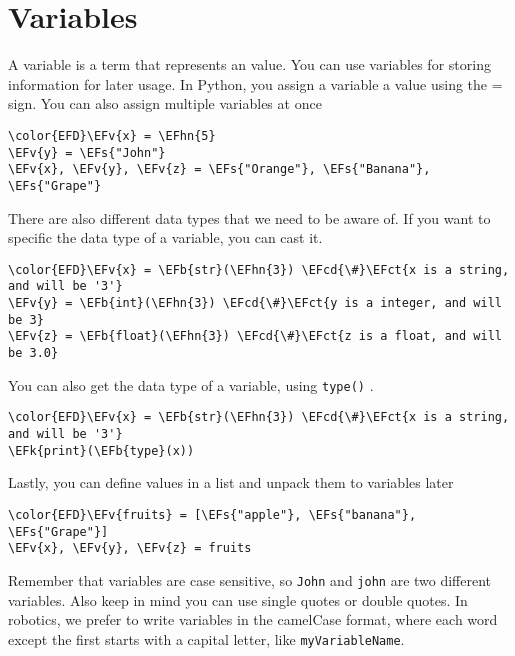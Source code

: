 \documentclass{scrartcl}
\newcommand{\EFk}[1]{\textcolor{EFk}{#1}} %
\newcommand{\EFs}[1]{\textcolor{EFs}{#1}} %
\newcommand{\EFb}[1]{\textcolor{EFb}{#1}} %
\newcommand{\EFct}[1]{\textcolor{EFct}{#1}} %
\newcommand{\EFv}[1]{\textcolor{EFv}{#1}} %
\newcommand{\EFcd}[1]{\textcolor{EFcd}{#1}} %
\newcommand{\EFhn}[1]{\textcolor{EFhn}{\textbf{#1}}} %
\begin{document}
\section{Variables}
\label{sec:org61157c0}
A variable is a term that represents an value. You can use variables for storing
information for later usage. In Python, you assign a variable a value using the
= sign. You can also assign multiple variables at once
\begin{Code}
\begin{Verbatim}[]
\color{EFD}\EFv{x} = \EFhn{5}
\EFv{y} = \EFs{"John"}
\EFv{x}, \EFv{y}, \EFv{z} = \EFs{"Orange"}, \EFs{"Banana"}, \EFs{"Grape"}
\end{Verbatim}
\end{Code}
There are also different data types that we need to be aware of. If you want to
specific the data type of a variable, you can cast it.
\begin{Code}
\begin{Verbatim}[]
\color{EFD}\EFv{x} = \EFb{str}(\EFhn{3}) \EFcd{\#}\EFct{x is a string, and will be '3'}
\EFv{y} = \EFb{int}(\EFhn{3}) \EFcd{\#}\EFct{y is a integer, and will be 3}
\EFv{z} = \EFb{float}(\EFhn{3}) \EFcd{\#}\EFct{z is a float, and will be 3.0}
\end{Verbatim}
\end{Code}
You can also get the data type of a variable, using \texttt{type()} .
\begin{Code}
\begin{Verbatim}[]
\color{EFD}\EFv{x} = \EFb{str}(\EFhn{3}) \EFcd{\#}\EFct{x is a string, and will be '3'}
\EFk{print}(\EFb{type}(x))
\end{Verbatim}
\end{Code}
Lastly, you can define values in a list and unpack them to variables later
\begin{Code}
\begin{Verbatim}[]
\color{EFD}\EFv{fruits} = [\EFs{"apple"}, \EFs{"banana"}, \EFs{"Grape"}]
\EFv{x}, \EFv{y}, \EFv{z} = fruits
\end{Verbatim}
\end{Code}
Remember that variables are case sensitive, so \texttt{John} and \texttt{john} are two different
variables. Also keep in mind you can use single quotes or double quotes. In
robotics, we prefer to write variables in the camelCase format, where each word
except the first starts with a capital letter, like \texttt{myVariableName}.
\end{document}
